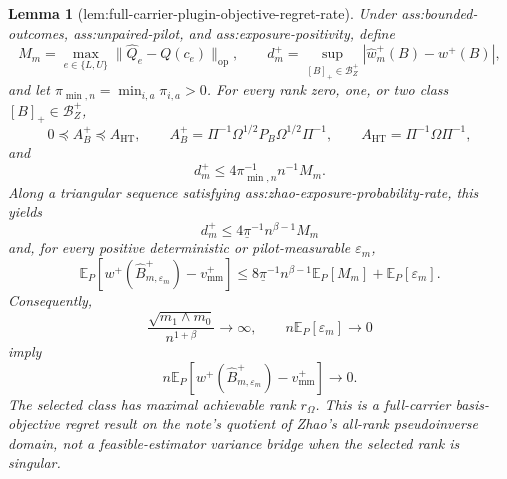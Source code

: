 \documentclass{article}
\newtheorem{lemma}{Lemma}
\begin{document}
\begin{lemma}[lem:full-carrier-plugin-objective-regret-rate]\label{lem:full-carrier-plugin-objective-regret-rate}
Under ass:bounded-outcomes, ass:unpaired-pilot, and ass:exposure-positivity, define
\[
 M_m=\max_{e\in\{L,U\}}\lVert\widehat Q_e-Q(c_e)\rVert_{\mathrm{op}},
 \qquad
 d_m^+=\sup_{[B]_+\in\mathcal B_Z^+}
 |\widehat w_m^+(B)-w^+(B)|,
\]
and let \(\pi_{\min,n}=\min_{i,a}\pi_{i,a}>0\).  For every rank zero, one, or two class \([B]_+\in\mathcal B_Z^+\),
\[
 0\preceq A_B^+\preceq A_{\mathrm{HT}},
 \qquad
 A_B^+=\Pi^{-1}\Omega^{1/2}P_B\Omega^{1/2}\Pi^{-1},
 \qquad
 A_{\mathrm{HT}}=\Pi^{-1}\Omega\Pi^{-1},
\]
and
\[
 d_m^+\le 4\pi_{\min,n}^{-1}n^{-1}M_m.
\]
Along a triangular sequence satisfying ass:zhao-exposure-probability-rate, this yields
\[
 d_m^+\le4\underline\pi^{-1}n^{\beta-1}M_m
\tag{A}
\]
and, for every positive deterministic or pilot-measurable \(\varepsilon_m\),
\[
 \mathbb E_P\!\left[
 w^+(\widehat B_{m,\varepsilon_m}^+)-v_{\mathrm{mm}}^+
 \right]
 \le
 8\underline\pi^{-1}n^{\beta-1}\mathbb E_P[M_m]
 +\mathbb E_P[\varepsilon_m].
\tag{B}
\]
Consequently,
\[
 \frac{\sqrt{m_1\wedge m_0}}{n^{1+\beta}}\longrightarrow\infty,
 \qquad n\mathbb E_P[\varepsilon_m]\longrightarrow0
\]
imply
\[
 n\mathbb E_P\!\left[
 w^+(\widehat B_{m,\varepsilon_m}^+)-v_{\mathrm{mm}}^+
 \right]\longrightarrow0.
\]
The selected class has maximal achievable rank \(r_\Omega\).  This is a full-carrier basis-objective regret result on the note's quotient of Zhao's all-rank pseudoinverse domain, not a feasible-estimator variance bridge when the selected rank is singular.
\end{lemma}
\end{document}
